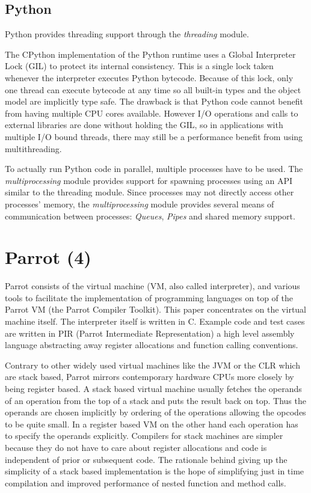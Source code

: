 \documentclass[bachelor,english]{hgbthesis}
\begin{document}
\section{Python}

Python provides threading support through the \textit{threading} module.

The CPython implementation of the Python runtime uses a Global Interpreter Lock (GIL) to protect its internal consistency\cite{PythonThreadingManual}. This is a single lock taken whenever the interpreter executes Python bytecode. Because of this lock, only one thread can execute bytecode at any time so all built-in types and the object model are implicitly type safe. The drawback is that Python code cannot benefit from having multiple CPU cores available. However I/O operations and calls to external libraries are done without holding the GIL, so in applications with multiple I/O bound threads, there may still be a performance benefit from using multithreading.

To actually run Python code in parallel, multiple processes have to be used. The \textit{multiprocessing} module provides support for spawning processes using an API similar to the threading module\cite{PythonMultiProcessingManual}. Since processes may not directly access other processes' memory, the \textit{multiprocessing} module provides several means of communication between processes: \textit{Queues}, \textit{Pipes} and shared memory support.

\chapter{Parrot (4)}

Parrot consists of the virtual machine (VM, also called interpreter), and various tools to facilitate the implementation of programming languages on top of the Parrot VM (the Parrot Compiler Toolkit). This paper concentrates on the virtual machine itself. The interpreter itself is written in C. Example code and test cases are written in PIR (Parrot Intermediate Representation) a high level assembly language abstracting away register allocations and function calling conventions.

Contrary to other widely used virtual machines like the JVM or the CLR which are stack based, Parrot mirrors contemporary hardware CPUs more closely by being register based. A stack based virtual machine usually fetches the operands of an operation from the top of a stack and puts the result back on top. Thus the operands are chosen implicitly by ordering of the operations allowing the opcodes to be quite small. In a register based VM on the other hand each operation has to specify the operands explicitly. Compilers for stack machines are simpler because they do not have to care about register allocations and code is independent of prior or subsequent code\cite{VMShowdown}. The rationale behind giving up the simplicity of a stack based implementation is the hope of simplifying just in time compilation and improved performance of nested function and method calls.
\end{document}
